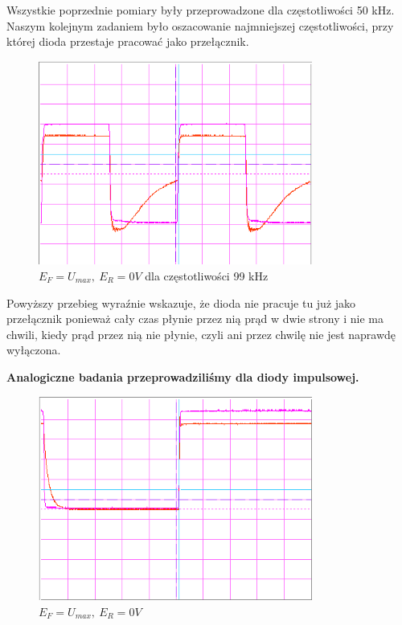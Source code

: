 \documentclass[a4paper,11pt]{article}
\begin{document}
Wszystkie poprzednie pomiary były przeprowadzone dla częstotliwości 50 kHz. Naszym kolejnym zadaniem było oszacowanie najmniejszej częstotliwości, przy której dioda przestaje pracować jako przełącznik.

\begin{figure} [H]
  \begin{center}
    \includegraphics[width = 9cm]{../Obrazki_i_tekst/obrobione/2ciety.png}
    \caption{\( E_F = U_{max}, \ E_R = 0V \) dla częstotliwości 99 kHz }
  \end{center}
\end{figure}


Powyższy przebieg wyraźnie wskazuje, że dioda nie pracuje tu już jako przełącznik ponieważ cały czas płynie przez nią prąd w dwie strony i nie ma chwili, kiedy prąd przez nią nie płynie, czyli ani przez chwilę nie jest naprawdę wyłączona.

\textbf{Analogiczne badania przeprowadziliśmy dla diody impulsowej.}




\begin{figure} [H]
  \begin{center}
    \includegraphics[width = 9cm]{../Obrazki_i_tekst/obrobione/31asciety.png}
    \caption{\( E_F = U_{max}, \ E_R = 0V \)}
  \end{center}
\end{figure}
\end{document}
